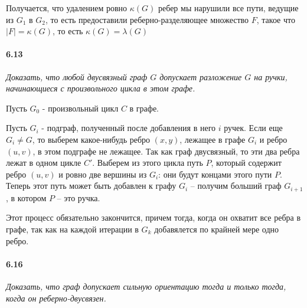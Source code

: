 \documentclass[russian]{article}
\begin{document}
Получается, что удалением ровно $\kappa(G)$ ребер мы нарушили все пути, ведущие из $G_1$ в $G_2$, то есть предоставили реберно-разделяющее множество $F$, такое что $|F| = \kappa(G)$, то есть $\kappa(G) = \lambda(G)$

\paragraph{6.13} \textit{Доказать, что любой двусвязный граф $G$ допускает разложение $G$ на ручки, начинающиеся с произвольного цикла в этом графе.}

Пусть $G_0$ - произвольный цикл $C$ в графе.

Пусть $G_i$ - подграф, полученный после добавления в него $i$ ручек. Если еще $G_i \neq G$, то выберем какое-нибудь ребро $(x,y)$, лежащее в графе $G_i$ и ребро $(u, v)$, в этом подграфе не лежащее. Так как граф двусвязный, то эти два ребра лежат в одном цикле $C'$. Выберем из этого цикла путь $P$, который содержит ребро $(u, v)$ и ровно две вершины из $G_i$: они будут концами этого пути $P$. Теперь этот путь может быть добавлен к графу $G_i$ -- получим больший граф $G_{i+1}$, в котором $P$ -- это ручка.

Этот процесс обязательно закончится, причем тогда, когда он охватит все ребра в графе, так как на каждой итерации в $G_k$ добавялется по крайней мере одно ребро.

\paragraph{6.16} \textit{Доказать, что граф допускает сильную ориентацию тогда и только тогда, когда он реберно-двусвязен.}
\end{document}
